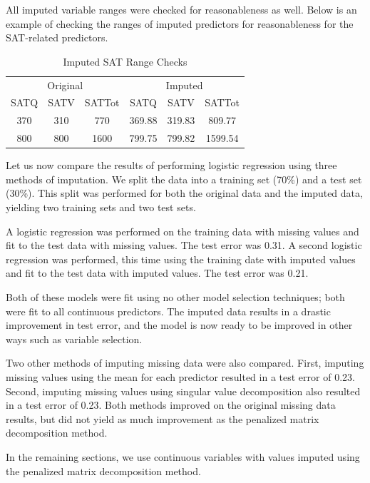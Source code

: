 \documentclass{article}
\begin{document}
All imputed variable ranges were checked for reasonableness as well.  Below is an example of checking the ranges of imputed predictors for reasonableness for the SAT-related predictors.

\begin{table}[H]
  \caption{Imputed SAT Range Checks}
  \label{sample-table1}
  \centering
  \begin{tabular}{cccccc}
    \toprule
    \multicolumn{3}{c}{Original} &
    \multicolumn{3}{c}{Imputed}\\

    \cmidrule{1-6}
    SATQ  &SATV &SATTot  & SATQ  &SATV &SATTot\\
    \midrule
     370	& 310	& \phantom{0}770	& 369.88	& 319.83	& \phantom{0}809.77	\\
     800	& 800	& 1600  			& 799.75	& 799.82	& 1599.54			\\
    \bottomrule
  \end{tabular}
\end{table}

Let us now compare the results of performing logistic regression using three methods of imputation.  We split the data into a training set (70\%) and a test set (30\%).  This split was performed for both the original data and the imputed data, yielding two training sets and two test sets.

A logistic regression was performed on the training data with missing values and fit to the test data with missing values.  The test error was 0.31.  A second logistic regression was performed, this time using the training date with imputed values and fit to the test data with imputed values.  The test error was 0.21.

Both of these models were fit using no other model selection techniques; both were fit to all continuous predictors. The imputed data results in a drastic improvement in test error, and the model is now ready to be improved in other ways such as variable selection.

Two other methods of imputing missing data were also compared.  First, imputing missing values using the mean for each predictor resulted in a test error of 0.23.  Second, imputing missing values using singular value decomposition also resulted in a test error of 0.23.  Both methods improved on the original missing data results, but did not yield as much improvement as the penalized matrix decomposition method.

In the remaining sections, we use continuous variables with values imputed using the penalized matrix decomposition method.
\end{document}
